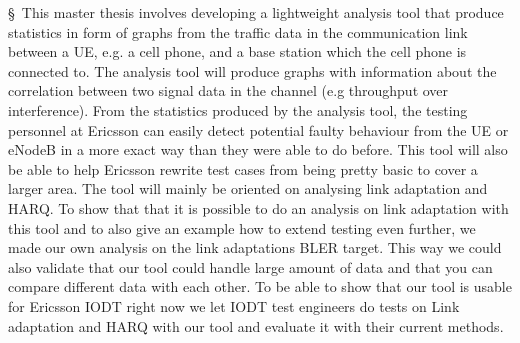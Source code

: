 \documentclass [cropmarks, frame, english, master]{idaexhibitpage}
\author {Paul Nedstrand \& Razmus Lindgren}
\begin{document}
\exhibitpagebeforeabstract 
 \S  \ This master thesis involves developing a lightweight analysis tool that produce statistics in form of graphs from the traffic data in the communication link between a UE, e.g. a cell phone, and a base station which the cell phone is connected to. The analysis tool will produce graphs with information about the correlation between two signal data in the channel (e.g throughput over interference). From the statistics produced by the analysis tool, the testing personnel at Ericsson can easily detect potential faulty behaviour from the UE or eNodeB in a more exact way than they were able to do before. This tool will also be able to help Ericsson rewrite test cases from being pretty basic to cover a larger area. The tool will mainly be oriented on analysing link adaptation and HARQ. To show that that it is possible to do an analysis on link adaptation with this tool and to also give an example how to extend testing even further, we made our own analysis on the link adaptations BLER target. This way we could also validate that our tool could handle large amount of data and that you can compare different data with each other. To be able to show that our tool is usable for Ericsson IODT right now we let IODT test engineers do tests on Link adaptation and HARQ with our tool and evaluate it with their current methods. 
\exhibitpageafterabstract 
\end{document}
